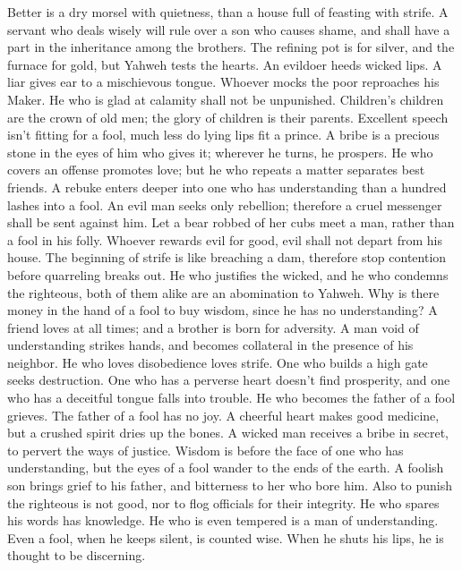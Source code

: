  Better is a dry morsel with quietness, than a house full of
feasting with strife.  A servant who deals wisely will rule
over a son who causes shame, and shall have a part in the inheritance
among the brothers.  The refining pot is for silver, and the
furnace for gold, but Yahweh tests the hearts.  An evildoer
heeds wicked lips. A liar gives ear to a mischievous tongue.
 Whoever mocks the poor reproaches his Maker. He who is glad
at calamity shall not be unpunished.  Children's children
are the crown of old men; the glory of children is their parents.
 Excellent speech isn't fitting for a fool, much less do
lying lips fit a prince.  A bribe is a precious stone in the
eyes of him who gives it; wherever he turns, he prospers. 
He who covers an offense promotes love; but he who repeats a matter
separates best friends.  A rebuke enters deeper into one
who has understanding than a hundred lashes into a fool. 
An evil man seeks only rebellion; therefore a cruel messenger shall be
sent against him.  Let a bear robbed of her cubs meet a
man, rather than a fool in his folly.  Whoever rewards evil
for good, evil shall not depart from his house.  The
beginning of strife is like breaching a dam, therefore stop contention
before quarreling breaks out.  He who justifies the wicked,
and he who condemns the righteous, both of them alike are an abomination
to Yahweh.  Why is there money in the hand of a fool to buy
wisdom, since he has no understanding?  A friend loves at
all times; and a brother is born for adversity.  A man void
of understanding strikes hands, and becomes collateral in the presence
of his neighbor.  He who loves disobedience loves strife.
One who builds a high gate seeks destruction.  One who has
a perverse heart doesn't find prosperity, and one who has a deceitful
tongue falls into trouble.  He who becomes the father of a
fool grieves. The father of a fool has no joy.  A cheerful
heart makes good medicine, but a crushed spirit dries up the bones.
 A wicked man receives a bribe in secret, to pervert the
ways of justice.  Wisdom is before the face of one who has
understanding, but the eyes of a fool wander to the ends of the earth.
 A foolish son brings grief to his father, and bitterness
to her who bore him.  Also to punish the righteous is not
good, nor to flog officials for their integrity.  He who
spares his words has knowledge. He who is even tempered is a man of
understanding.  Even a fool, when he keeps silent, is
counted wise. When he shuts his lips, he is thought to be discerning.


